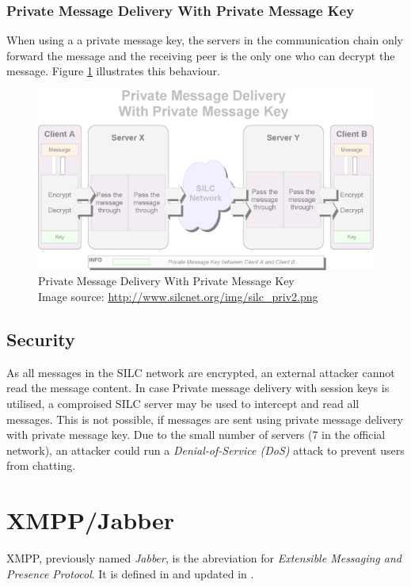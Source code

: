 \subsubsection{Private Message Delivery With Private Message Key}
When using a a private message key, the servers in the communication chain
only forward the message and the receiving peer is the only one who can
decrypt the message. Figure \ref{silcprivkey} illustrates this behaviour.
\begin{figure}
    \centering
    \caption[Silc: Private Message Delivery With Private Message Key]{Private Message Delivery With Private Message Key\\Image source: \protect\url{http://www.silcnet.org/img/silc_priv2.png}}
    \label{silcprivkey}
    \includegraphics[scale=0.8]{silc_priv2.png}
\end{figure}
\subsection{Security}
As all messages in the SILC network are encrypted, an external attacker
cannot read the message content. In case Private message delivery with session keys
is utilised, a comproised SILC server may be used to intercept and read all
messages. This is not possible, if messages are sent using
private message delivery with private message key.
Due to the small number of servers (7 in the official network),
an attacker could run a \textit{Denial-of-Service (DoS)} attack to prevent
users from chatting.

\section{XMPP/Jabber}
XMPP, previously named \textit{Jabber}, is the abreviation for
\textit{Extensible Messaging and Presence Protocol}.
It is defined in \cite{rfc3920,rfc3921,rfc3922,rfc3923,rfc4622,rfc4854,rfc4979}
and updated in \cite{rfc6120,rfc6121}.

